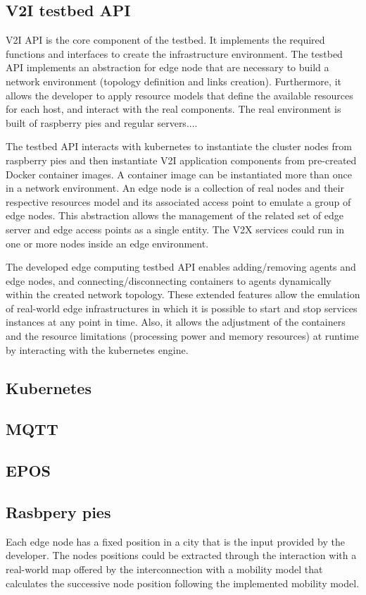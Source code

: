 \documentclass[conference]{IEEEtran}
\begin{document}
\subsection{V2I testbed API}
\par V2I API is the core component of the testbed. It implements the required functions and interfaces to create the infrastructure environment. The testbed API implements an abstraction for edge node that are necessary to build a network environment (topology definition and links creation). Furthermore, it allows the developer to apply resource models that
define the available resources for each host, and interact with the real components.
The real environment is built of raspberry pies and regular servers.... 
\par The testbed API interacts with kubernetes to instantiate the cluster nodes from raspberry pies and then instantiate V2I application components from pre-created Docker container images. A container image can be instantiated more than once in a network environment. An edge node is a collection of real nodes and their respective resources model and its associated access point to emulate a group of edge nodes. This abstraction allows the management of the related set of edge server and edge access points as a single entity. The V2X services could run in one or more nodes inside an edge environment.
\par The developed edge computing testbed API enables adding/removing agents and edge nodes, and connecting/disconnecting containers to agents dynamically within the created network topology. These extended features allow the emulation of real-world edge infrastructures in which it is possible to start and stop services instances at any point in time. Also, it allows the adjustment of the containers and the resource limitations (processing power and memory resources) at runtime by interacting with the kubernetes engine. 

\subsection{Kubernetes}
\subsection{MQTT}
\subsection{EPOS}
\subsection{Rasbpery pies}
Each edge node has a fixed position in a city that is the input provided by the developer.
The nodes positions could be extracted through the interaction with a real-world map offered by the interconnection with a mobility model that calculates the successive node position following the implemented mobility model. 
\end{document}
